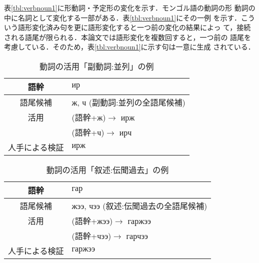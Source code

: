 表\ref{tbl:verbnoun1}に形動詞・予定形の変化を示す．モンゴル語の動詞の形
動詞の中に名詞として変化する一部がある．表\ref{tbl:verbnoun1}にその一例
を示す．こういう語形変化済み句を更に語形変化すると一つ前の変化の結果によっ
て，接続される語尾が限られる．本論文では語形変化を複数回すると，一つ前の
語尾を考慮している．そのため，表\ref{tbl:verbnoun1}に示す句は一意に生成
されている．

\begin{table*}
 \caption{\label{tbl:verbphrase1}動詞の活用「副動詞:並列」の例}
\begin{center}
  \begin{tabular}{|c|p{3.8in}|}
   \hline
   語幹 & ${и\!\!р}$\\
   \hline
   語尾候補         & {ж, ч} (副動詞:並列の全語尾候補) \\
   \hline
   活用 & (語幹+{ж})$\longrightarrow$ ${и\!\!р\!\!ж}$ \\
   & (語幹+{ч})$\longrightarrow$ ${и\!\!р\!\!ч}$ \\
   \hline
   人手による検証  & ${и\!\!р\!\!ж}$ \\
   \hline
  \end{tabular}
 \end{center}
\end{table*}

\begin{table*}
 \caption{\label{tbl:verbphrase2}動詞の活用「叙述:伝聞過去」の例}
 \begin{center}
  \begin{tabular}{|c|p{3.8in}|}
   \hline
   語幹 & ${г\!\!а\!\!р}$ \\
   \hline
   語尾候補         & ${ж\!\!э\!\!э}$, ${ч\!\!э\!\!э}$ (叙述:伝聞過去の全語尾候補) \\
   \hline
   活用 & (語幹+${ж\!\!э\!\!э}$)$\longrightarrow$ ${г\!\!а\!\!р\!\!ж\!\!э\!\!э}$ \\
   & (語幹+${ч\!\!э\!\!э}$)$\longrightarrow$ ${г\!\!а\!\!р\!\!ч\!\!э\!\!э}$  \\
   \hline
   人手による検証  & ${г\!\!а\!\!р\!\!ж\!\!э\!\!э}$  \\
   \hline
  \end{tabular}
 \end{center}
\end{table*}


